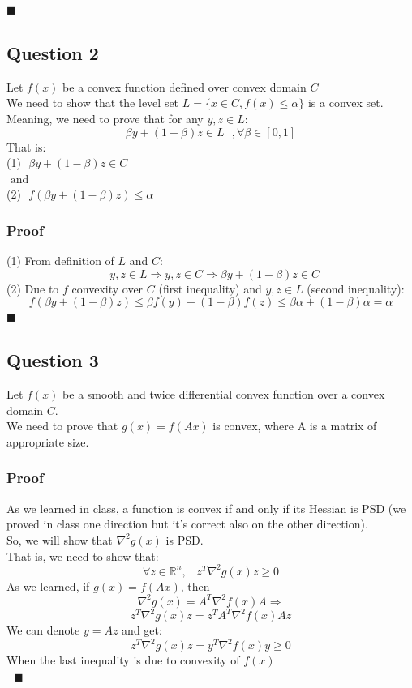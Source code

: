 \documentclass{article}
\newcommand{\qed}{\hfill$\blacksquare$}
\begin{document}
\qed\\
\subsection{Question 2}
Let $f(x)$ be a convex function defined over convex domain $C$\\
We need to show that the level set $L = \{x \in C, f(x) \leq \alpha \}$ is a convex set.
Meaning, we need to prove that for any $y,z \in L$:
$$\beta y + (1-\beta)z \in L \:\:\:, \forall \beta \in [0,1]$$
That is:\\
(1)$\:\:\:\beta y + (1-\beta)z \in C$\\
$\text{ and }$\\
(2)$\:\:\:f(\beta y + (1-\beta)z) \leq \alpha$
\subsubsection*{Proof}
(1) From definition of $L$ and $C$:
$$\:\:\: y,z \in L \Rightarrow y,z \in C \Rightarrow \beta y + (1-\beta)z \in C$$
(2) Due to $f$ convexity over $C$ (first inequality) and $y,z \in L$ (second inequality):
$$f(\beta y + (1-\beta)z) \leq \beta f(y) + (1-\beta)f(z) \leq  \beta \alpha  + (1-\beta)\alpha = \alpha$$
\qed\\

\newpage
\subsection{Question 3}
Let $f(x)$ be a smooth and twice differential convex function over a convex domain $C$.\\
We need to prove that $g(x) = f(Ax)$ is convex, where A is a matrix of appropriate size.
\subsubsection*{Proof}
As we learned in class, a function is convex if and only if its Hessian is PSD (we proved in class one direction but it's correct also on the other direction).\\
So, we will show that $\nabla^2 g(x)$ is PSD.\\
That is, we need to show that:
$$\forall z \in \mathbb{R}^n, \;\;\; z^T \nabla^2 g(x) z \geq 0$$
As we learned, if $g(x) = f(Ax)$, then 
$$\nabla^2 g(x) = A^T \nabla^2 f(x) A \Rightarrow$$
$$z^T \nabla^2 g(x) z = z^T A^T \nabla^2 f(x) A z$$
We can denote $y = Az$ and get:
$$z^T \nabla^2 g(x) z = y^T \nabla^2 f(x) y \geq 0$$
When the last inequality is due to convexity of $f(x)$\\
$\text{ }$\qed
\end{document}
